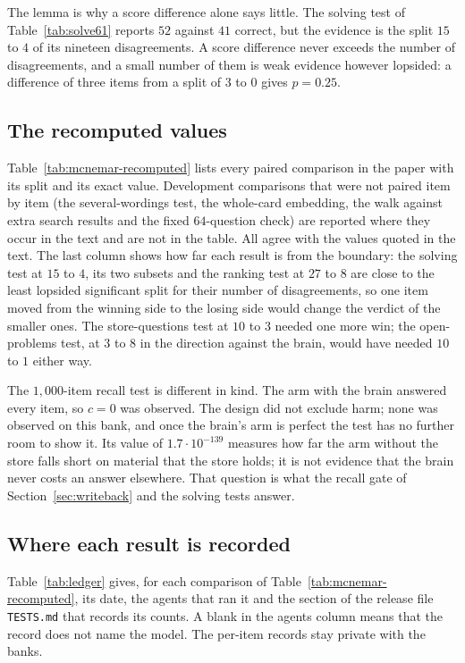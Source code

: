 The lemma is why a score difference alone says little. The solving test of Table~\ref{tab:solve61} reports $52$ against $41$ correct, but the evidence is the split $15$ to $4$ of its nineteen disagreements. A score difference never exceeds the number of disagreements, and a small number of them is weak evidence however lopsided: a difference of three items from a split of $3$ to $0$ gives $p=0.25$.



\subsection{The recomputed values}
Table~\ref{tab:mcnemar-recomputed} lists every paired comparison in the paper with its split and its exact value. Development comparisons that were not paired item by item (the several-wordings test, the whole-card embedding, the walk against extra search results and the fixed $64$-question check) are reported where they occur in the text and are not in the table. All agree with the values quoted in the text. The last column shows how far each result is from the boundary: the solving test at $15$ to $4$, its two subsets and the ranking test at $27$ to $8$ are close to the least lopsided significant split for their number of disagreements, so one item moved from the winning side to the losing side would change the verdict of the smaller ones. The store-questions test at $10$ to $3$ needed one more win; the open-problems test, at $3$ to $8$ in the direction against the brain, would have needed $10$ to $1$ either way.

The $1{,}000$-item recall test is different in kind. The arm with the brain answered every item, so $c=0$ was observed. The design did not exclude harm; none was observed on this bank, and once the brain's arm is perfect the test has no further room to show it. Its value of $1.7\cdot10^{-139}$ measures how far the arm without the store falls short on material that the store holds; it is not evidence that the brain never costs an answer elsewhere. That question is what the recall gate of Section~\ref{sec:writeback} and the solving tests answer.

\subsection{Where each result is recorded}
Table~\ref{tab:ledger} gives, for each comparison of Table~\ref{tab:mcnemar-recomputed}, its date, the agents that ran it and the section of the release file \texttt{TESTS.md} that records its counts. A blank in the agents column means that the record does not name the model. The per-item records stay private with the banks.

